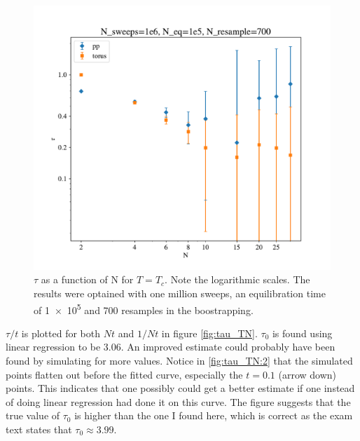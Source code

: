 \documentclass[12pt, a4paper]{article}
\begin{document}
\begin{figure}[H]
  \centering
  \includegraphics[width=.75\textwidth]{media/tau_N}
  \caption{$\tau$ as a function of N for $T=T_c$.
    Note the logarithmic scales.
    The results were optained with one million sweeps, an equilibration time of \num{1e5} and 700 resamples in the boostrapping.
    \label{fig:tau_N}}
\end{figure}

$\tau/t$ is plotted for both $Nt$ and $1/Nt$ in figure \ref{fig:tau_TN}.
$\tau_0$ is found using linear regression to be 3.06.
An improved estimate could probably have been found by simulating for more values.
Notice in \ref{fig:tau_TN:2} that the simulated points flatten out before the fitted curve, especially the $t=0.1$ (arrow down) points.
This indicates that one possibly could get a better estimate if one instead of doing linear regression had done it on this curve.
The figure suggests that the true value of $\tau_0$ is higher than the one I found here, which is correct as the exam text states that $\tau_0\approx 3.99$.
\end{document}
